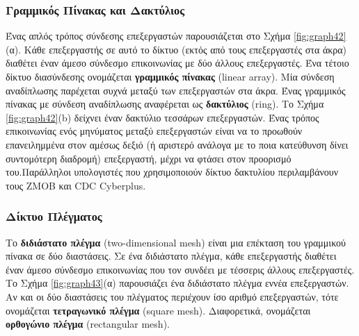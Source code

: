 \documentclass[12pt,a4paper]{article} %
\begin{document}
\subsubsection*{Γραμμικός Πίνακας και Δακτύλιος}
\begin{sloppypar}
Ένας απλός τρόπος σύνδεσης επεξεργαστών παρουσιάζεται στο Σχήμα \ref{fig:graph42}(α). 
Κάθε επεξεργαστής σε αυτό το δίκτυο (εκτός από τους επεξεργαστές στα άκρα) 
διαθέτει έναν άμεσο σύνδεσμο επικοινωνίας με δύο άλλους επεξεργαστές. 
Ένα τέτοιο δίκτυο διασύνδεσης ονομάζεται \textbf{γραμμικός πίνακας} 
(linear array). Μία σύνδεση αναδίπλωσης παρέχεται 
συχνά μεταξύ των επεξεργαστών στα άκρα. 
Ένας γραμμικός πίνακας με σύνδεση αναδίπλωσης αναφέρεται ως \textbf{δακτύλιος} 
(ring). Το Σχήμα \ref{fig:graph42}(b) δείχνει 
έναν δακτύλιο τεσσάρων επεξεργαστών. Ένας τρόπος επικοινωνίας ενός μηνύματος 
μεταξύ επεξεργαστών είναι να το προωθούν επανειλημμένα στον αμέσως δεξιό 
(ή αριστερό ανάλογα με το ποια κατεύθυνση δίνει συντομότερη διαδρομή) 
επεξεργαστή, μέχρι να φτάσει στον προορισμό του.Παράλληλοι υπολογιστές 
που χρησιμοποιούν δίκτυο δακτυλίου περιλαμβάνουν τους 
ZMOB και CDC Cyberplus.
\end{sloppypar}

\subsubsection*{Δίκτυο Πλέγματος}
\begin{sloppypar}
Το \textbf{διδιάστατο πλέγμα} (two-dimensional mesh) 
είναι μια επέκταση του γραμμικού πίνακα σε δύο διαστάσεις. Σε ένα 
διδιάστατο πλέγμα, κάθε επεξεργαστής διαθέτει έναν άμεσο σύνδεσμο 
επικοινωνίας που τον συνδέει με τέσσερις άλλους επεξεργαστές. Το Σχήμα 
\ref{fig:graph43}(α) παρουσιάζει ένα διδιάστατο πλέγμα εννέα επεξεργαστών. 
Αν και οι δύο διαστάσεις του πλέγματος περιέχουν ίσο αριθμό επεξεργαστών, 
τότε ονομάζεται \textbf{τετραγωνικό πλέγμα} (square mesh). 
Διαφορετικά, ονομάζεται \textbf{ορθογώνιο πλέγμα}
(rectangular mesh).
\end{sloppypar}
\end{document}
